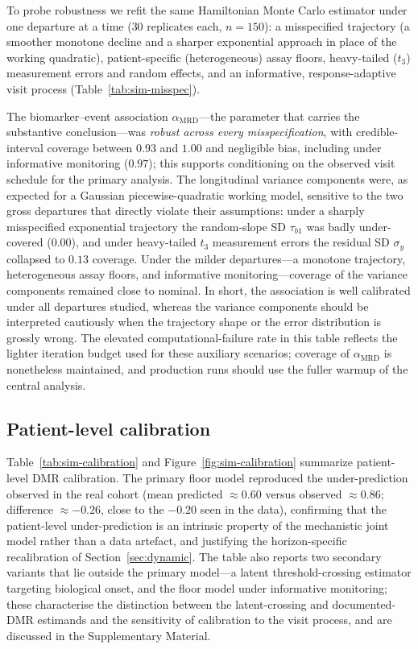 \documentclass[11pt]{article}
\begin{document}
To probe robustness we refit the same Hamiltonian Monte Carlo estimator under
one departure at a time ($30$ replicates each, $n=150$): a misspecified
trajectory (a smoother monotone decline and a sharper exponential approach in
place of the working quadratic), patient-specific (heterogeneous) assay floors,
heavy-tailed ($t_3$) measurement errors and random effects, and an informative,
response-adaptive visit process (Table~\ref{tab:sim-misspec}).

The biomarker--event association $\alpha_{\mathrm{MRD}}$---the parameter that
carries the substantive conclusion---was \emph{robust across every
misspecification}, with credible-interval coverage between $0.93$ and $1.00$ and
negligible bias, including under informative monitoring ($0.97$); this supports
conditioning on the observed visit schedule for the primary analysis. The
longitudinal variance components were, as expected for a Gaussian
piecewise-quadratic working model, sensitive to the two gross departures that
directly violate their assumptions: under a sharply misspecified exponential
trajectory the random-slope SD $\tau_{b1}$ was badly under-covered ($0.00$), and
under heavy-tailed $t_3$ measurement errors the residual SD $\sigma_y$ collapsed
to $0.13$ coverage. Under the milder departures---a monotone trajectory,
heterogeneous assay floors, and informative monitoring---coverage of the
variance components remained close to nominal. In short, the association is
well calibrated under all departures studied, whereas the variance components
should be interpreted cautiously when the trajectory shape or the error
distribution is grossly wrong. The elevated computational-failure rate in this
table reflects the lighter iteration budget used for these auxiliary scenarios;
coverage of $\alpha_{\mathrm{MRD}}$ is nonetheless maintained, and production
runs should use the fuller warmup of the central analysis.



\subsection{Patient-level calibration}

Table~\ref{tab:sim-calibration} and Figure~\ref{fig:sim-calibration}
summarize patient-level DMR calibration. The primary floor model reproduced
the under-prediction observed in the real cohort (mean predicted
$\approx0.60$ versus observed $\approx0.86$; difference $\approx-0.26$,
close to the $-0.20$ seen in the data), confirming that the patient-level
under-prediction is an intrinsic property of the mechanistic joint model
rather than a data artefact, and justifying the horizon-specific
recalibration of Section~\ref{sec:dynamic}. The table also reports two
secondary variants that lie outside the primary model---a latent
threshold-crossing estimator targeting biological onset, and the floor model
under informative monitoring; these characterise the distinction between the
latent-crossing and documented-DMR estimands and the sensitivity of
calibration to the visit process, and are discussed in the Supplementary
Material.
\end{document}
